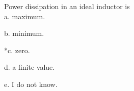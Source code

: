 
Power dissipation in an ideal inductor is\\

a. maximum.

b. minimum.

*c. zero.

d. a finite value.

e. I do not know.\\
